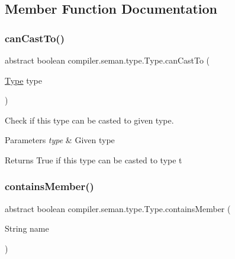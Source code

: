 \subsection{Member Function Documentation}
\mbox{\label{classcompiler_1_1seman_1_1type_1_1_type_aa8b9322fe9d70709a6889182d4915dc0}} 
\subsubsection{\texorpdfstring{can\+Cast\+To()}{canCastTo()}}
{\footnotesize\ttfamily abstract boolean compiler.\+seman.\+type.\+Type.\+can\+Cast\+To (\begin{DoxyParamCaption}\item[{\hyperlink{classcompiler_1_1seman_1_1type_1_1_type}{Type}}]{type }\end{DoxyParamCaption})\hspace{0.3cm}{\ttfamily [abstract]}}

Check if this type can be casted to given type. 
\begin{DoxyParams}{Parameters}
{\em type} & Given type \\
\hline
\end{DoxyParams}
\begin{DoxyReturn}{Returns}
True if this type can be casted to type t 
\end{DoxyReturn}
\mbox{\label{classcompiler_1_1seman_1_1type_1_1_type_a34730755860770c38f6d378f393c21ad}} 
\subsubsection{\texorpdfstring{contains\+Member()}{containsMember()}}
{\footnotesize\ttfamily abstract boolean compiler.\+seman.\+type.\+Type.\+contains\+Member (\begin{DoxyParamCaption}\item[{String}]{name }\end{DoxyParamCaption})\hspace{0.3cm}{\ttfamily [abstract]}}

